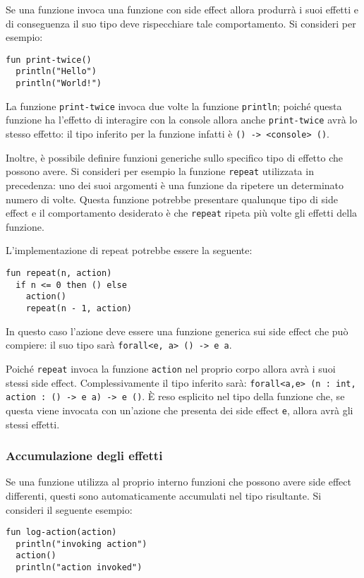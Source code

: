 Se una funzione invoca una funzione con side effect allora produrrà i suoi effetti e di conseguenza il suo tipo deve rispecchiare tale comportamento. Si consideri per esempio:
\begin{lstlisting}[language=koka]
fun print-twice()
  println("Hello")
  println("World!")
\end{lstlisting}
La funzione \lstinline{print-twice} invoca due volte la funzione \lstinline{println}; poiché questa funzione ha l'effetto di interagire con la console allora anche \lstinline{print-twice} avrà lo stesso effetto: il tipo inferito per la funzione infatti è \lstinline{() -> <console> ()}.

Inoltre, è possibile definire funzioni generiche sullo specifico tipo di effetto che possono avere. Si consideri per esempio la funzione \lstinline{repeat} utilizzata in precedenza: uno dei suoi argomenti è una funzione da ripetere un determinato numero di volte.
Questa funzione potrebbe presentare qualunque tipo di side effect e il comportamento desiderato è che \lstinline{repeat} ripeta più volte gli effetti della funzione.

L'implementazione di repeat potrebbe essere la seguente:
\begin{lstlisting}[language=koka]
fun repeat(n, action)
  if n <= 0 then () else
    action()
    repeat(n - 1, action)
\end{lstlisting}
In questo caso l'azione deve essere una funzione generica sui side effect che può compiere: il suo tipo sarà \lstinline{forall<e, a> () -> e a}.

Poiché \lstinline{repeat} invoca la funzione \lstinline{action} nel proprio corpo allora avrà i suoi stessi side effect. Complessivamente il tipo inferito sarà: \lstinline{forall<a,e> (n : int, action : () -> e a) -> e ()}. È reso esplicito nel tipo della funzione che, se questa viene invocata con un'azione che presenta dei side effect \lstinline{e}, allora avrà gli stessi effetti.

\subsubsection{Accumulazione degli effetti}
Se una funzione utilizza al proprio interno funzioni che possono avere side effect differenti, questi sono automaticamente accumulati nel tipo risultante. Si consideri il seguente esempio:
\begin{lstlisting}[language=koka]
fun log-action(action)
  println("invoking action")
  action()
  println("action invoked")
\end{lstlisting}


